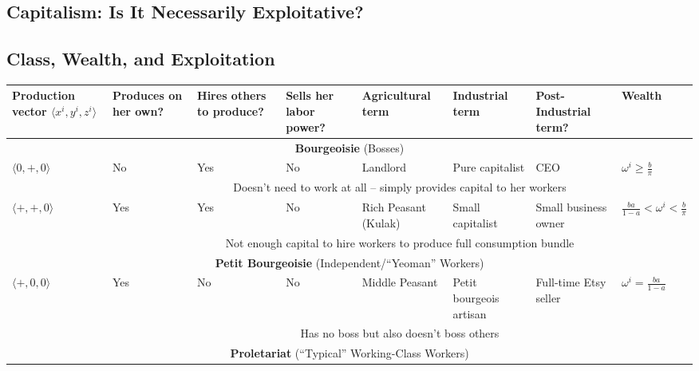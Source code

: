 \subsection{Capitalism: Is It Necessarily Exploitative?}

\subsection{Class, Wealth, and Exploitation}

\begin{table}[ht!]
	{\fontsize{10}{10}\selectfont
		\begin{tabularx}{\textwidth}{|p{1.6cm}||p{1.4cm}XXp{1.8cm}XXp{2.2cm}|} \hline
			Production vector $\langle x^i, y^i, z^i\rangle$ & \multicolumn{1}{p{1.4cm}|}{Produces on her own?} & \multicolumn{1}{X|}{Hires others to produce?} & \multicolumn{1}{X|}{Sells her labor power?} & \multicolumn{1}{p{1.8cm}|}{Agricultural term} & \multicolumn{1}{X|}{Industrial term} & \multicolumn{1}{X|}{Post-Industrial term?} & Wealth \\ \hline \hline
			\multicolumn{8}{|c|}{\textbf{Bourgeoisie} (Bosses)} \\ \hline
			$\langle 0, +, 0 \rangle$ & No & Yes & No & Landlord & Pure capitalist & CEO & $\omega^i \geq \frac{b}{\pi}$ \\
			& \multicolumn{7}{c|}{Doesn't need to work at all -- simply provides capital to her workers} \\ \hline
			$\langle +, +, 0 \rangle$ & Yes & Yes & No & Rich Peasant (Kulak) & Small capitalist & Small business owner & $\frac{ba}{1-a} < \omega^i < \frac{b}{\pi}$ \\
			& \multicolumn{7}{c|}{Not enough capital to hire workers to produce full consumption bundle} \\\hline \hline
			\multicolumn{8}{|c|}{\textbf{Petit Bourgeoisie} (Independent/``Yeoman'' Workers)} \\ \hline
			$\langle +, 0, 0 \rangle$ & Yes & No & No & Middle Peasant & Petit bourgeois artisan & Full-time Etsy seller & $\omega^i = \frac{ba}{1-a}$ \\
			& \multicolumn{7}{c|}{Has no boss but also doesn't boss others} \\\hline \hline
			\multicolumn{8}{|c|}{\textbf{Proletariat} (``Typical'' Working-Class Workers)} \\ \hline

\end{tabularx}}
\end{table}
